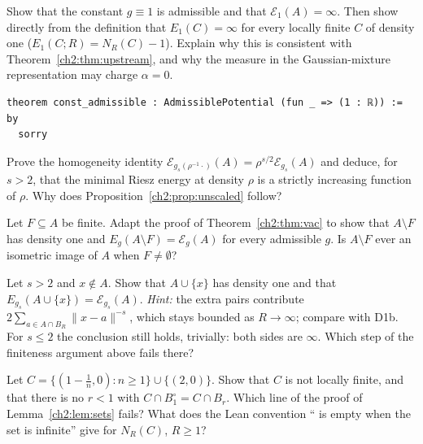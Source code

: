 \begin{exercise}\label{ch2:ex:const}
Show that the constant $g\equiv1$ is admissible and that $\mathcal{E}_1(A)=\infty$. Then show directly from the
definition that $E_1(C)=\infty$ for every locally finite $C$ of density one ($E_1(C;R)=N_R(C)-1$). Explain why this is
consistent with Theorem~\ref{ch2:thm:upstream}, and why the measure in the Gaussian-mixture representation may charge
$\alpha=0$.
\begin{lstlisting}[language=Lean]
theorem const_admissible : AdmissiblePotential (fun _ => (1 : ℝ)) := by
  sorry
\end{lstlisting}
\end{exercise}

\begin{exercise}\label{ch2:ex:homog}
Prove the homogeneity identity $\mathcal{E}_{g_s(\rho^{-1}\cdot)}(A)=\rho^{s/2}\mathcal{E}_{g_s}(A)$ and deduce, for
$s>2$, that the minimal Riesz energy at density $\rho$ is a strictly increasing function of $\rho$. Why does
Proposition~\ref{ch2:prop:unscaled} follow?
\end{exercise}

\begin{exercise}\label{ch2:ex:finite}
Let $F\subseteq A$ be finite. Adapt the proof of Theorem~\ref{ch2:thm:vac} to show that $A\setminus F$ has density one and
$E_g(A\setminus F)=\mathcal{E}_g(A)$ for every admissible $g$. Is $A\setminus F$ ever an isometric image of $A$ when
$F\neq\emptyset$?
\end{exercise}

\begin{exercise}\label{ch2:ex:add}
Let $s>2$ and $x\notin A$. Show that $A\cup\{x\}$ has density one and that $E_{g_s}(A\cup\{x\})=\mathcal{E}_{g_s}(A)$.
\emph{Hint:} the extra pairs contribute $2\sum_{a\in A\cap B_R}\|x-a\|^{-s}$, which stays bounded as $R\to\infty$; compare
with D1b. For $s\le2$ the conclusion still holds, trivially: both sides are $\infty$. Which step of the finiteness
argument above fails there?
\end{exercise}

\begin{exercise}\label{ch2:ex:lf}
Let $C=\{(1-\tfrac1n,0):n\ge1\}\cup\{(2,0)\}$. Show that $C$ is not locally finite, and that there is no $r<1$ with
$C\cap B^\circ_1=C\cap B_r$. Which line of the proof of Lemma~\ref{ch2:lem:sets} fails? What does the Lean convention
`` is empty when the set is infinite'' give for $N_R(C)$, $R\ge1$?
\end{exercise}

